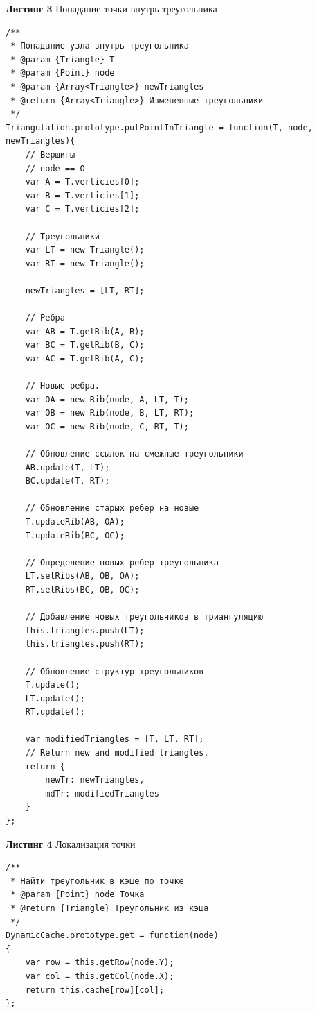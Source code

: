 \documentclass[a4paper, 12pt]{article}   	%
\begin{document}
\textbf{Листинг 3} Попадание точки внутрь треугольника
\begin{verbatim}
/**
 * Попадание узла внутрь треугольника
 * @param {Triangle} T
 * @param {Point} node
 * @param {Array<Triangle>} newTriangles
 * @return {Array<Triangle>} Измененные треугольники
 */
Triangulation.prototype.putPointInTriangle = function(T, node, newTriangles){
    // Вершины
    // node == O
    var A = T.verticies[0];
    var B = T.verticies[1];
    var C = T.verticies[2];

    // Треугольники
    var LT = new Triangle();
    var RT = new Triangle();

    newTriangles = [LT, RT];

    // Ребра
    var AB = T.getRib(A, B);
    var BC = T.getRib(B, C);
    var AC = T.getRib(A, C);

    // Новые ребра.
    var OA = new Rib(node, A, LT, T);
    var OB = new Rib(node, B, LT, RT);
    var OC = new Rib(node, C, RT, T);

    // Обновление ссылок на смежные треугольники
    AB.update(T, LT);
    BC.update(T, RT);

    // Обновление старых ребер на новые
    T.updateRib(AB, OA);
    T.updateRib(BC, OC);

    // Определение новых ребер треугольника
    LT.setRibs(AB, OB, OA);
    RT.setRibs(BC, OB, OC);

    // Добавление новых треугольников в триангуляцию
    this.triangles.push(LT);
    this.triangles.push(RT);

    // Обновление структур треугольников
    T.update();
    LT.update();
    RT.update();

    var modifiedTriangles = [T, LT, RT];
    // Return new and modified triangles.
    return {
        newTr: newTriangles,
        mdTr: modifiedTriangles
    }
};
\end{verbatim}

\textbf{Листинг 4} Локализация точки
\begin{verbatim}
/**
 * Найти треугольник в кэше по точке
 * @param {Point} node Точка
 * @return {Triangle} Треугольник из кэша
 */
DynamicCache.prototype.get = function(node)
{
    var row = this.getRow(node.Y);
    var col = this.getCol(node.X);
    return this.cache[row][col];
};
\end{verbatim}

\newpage
\end{document}
